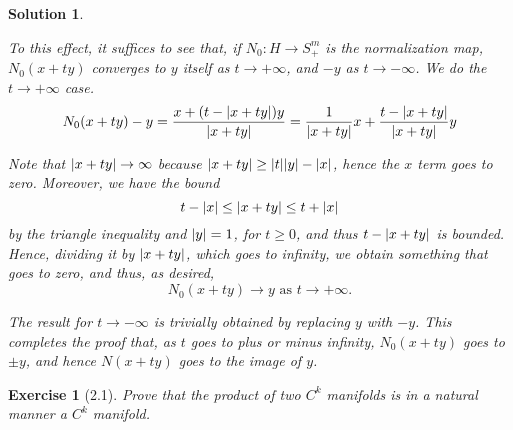 \documentclass{article}
\theoremstyle{plain}
\newtheorem*{ex}{Exercise}
\theoremstyle{nonumberplain}
\newtheorem{sol}{Solution}
\DeclarePairedDelimiter{\abs}{\lvert}{\rvert}
\DeclarePairedDelimiter{\norm}{\lvert}{\rvert}
\begin{document}
\begin{sol}
\begin{enumerate}
To this effect, it suffices to see that, if $N_0 \colon H \to S^m_+$ is the normalization map, $N_0(x + t y)$ converges to $y$ itself as $t \to +\infty$, and $-y$ as $t \to -\infty$. We do the $t \to +\infty$ case.
\begin{equation}
N_0(x + t y) - y = \frac{x + (t - \norm{x + t y}) y}{\norm{x + t y}} = \frac1{\norm{x + t y}} x + \frac{t - \norm{x + t y}}{\norm{x + t y}}y
\end{equation}

Note that $\norm{x + t y} \to \infty$ because $\norm{x+ty} \geq \abs{t} \norm{y} - \norm{x}$, hence the $x$ term goes to zero. Moreover, we have the bound
\begin{equation}
t - \norm x \leq \norm{x + t y} \leq t + \norm x
\end{equation}
by the triangle inequality and $\norm y = 1$, for $t \geq 0$, and thus $t - \norm{x + t y}$ is bounded. Hence, dividing it by $\norm{x + t y}$, which goes to infinity, we obtain something that goes to zero, and thus, as desired,
\begin{equation}
N_0(x + t y) \to y \text{ as $t \to +\infty$}.
\end{equation}

The result for $t \to -\infty$ is trivially obtained by replacing $y$ with $-y$. This completes the proof that, as $t$ goes to plus or minus infinity, $N_0(x + t y)$ goes to $\pm y$, and hence $N(x+ty)$ goes to the image of $y$.
\end{enumerate}
\end{sol}

\begin{ex}[2.1]
Prove that the product of two $C^k$ manifolds is in a natural manner a $C^k$ manifold.
\end{ex}
\end{document}
